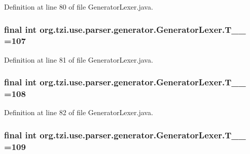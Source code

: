Definition at line 80 of file Generator\-Lexer.\-java.

\hypertarget{classorg_1_1tzi_1_1use_1_1parser_1_1generator_1_1_generator_lexer_a03fd2d65c77c0291e3d2287c87a16e67}{
\subsubsection[{T\-\_\-\-\_\-107}]{\setlength{\rightskip}{0pt plus 5cm}final int org.\-tzi.\-use.\-parser.\-generator.\-Generator\-Lexer.\-T\-\_\-\-\_ =107\hspace{0.3cm}{\ttfamily [static]}}}\label{classorg_1_1tzi_1_1use_1_1parser_1_1generator_1_1_generator_lexer_a03fd2d65c77c0291e3d2287c87a16e67}


Definition at line 81 of file Generator\-Lexer.\-java.

\hypertarget{classorg_1_1tzi_1_1use_1_1parser_1_1generator_1_1_generator_lexer_a62b1044f5e381b26691d8cd911668a9a}{
\subsubsection[{T\-\_\-\-\_\-108}]{\setlength{\rightskip}{0pt plus 5cm}final int org.\-tzi.\-use.\-parser.\-generator.\-Generator\-Lexer.\-T\-\_\-\-\_ =108\hspace{0.3cm}{\ttfamily [static]}}}\label{classorg_1_1tzi_1_1use_1_1parser_1_1generator_1_1_generator_lexer_a62b1044f5e381b26691d8cd911668a9a}


Definition at line 82 of file Generator\-Lexer.\-java.

\hypertarget{classorg_1_1tzi_1_1use_1_1parser_1_1generator_1_1_generator_lexer_a6a2d54eb4792e5a1053cd92b1aa65027}{
\subsubsection[{T\-\_\-\-\_\-109}]{\setlength{\rightskip}{0pt plus 5cm}final int org.\-tzi.\-use.\-parser.\-generator.\-Generator\-Lexer.\-T\-\_\-\-\_ =109\hspace{0.3cm}{\ttfamily [static]}}}\label{classorg_1_1tzi_1_1use_1_1parser_1_1generator_1_1_generator_lexer_a6a2d54eb4792e5a1053cd92b1aa65027}


